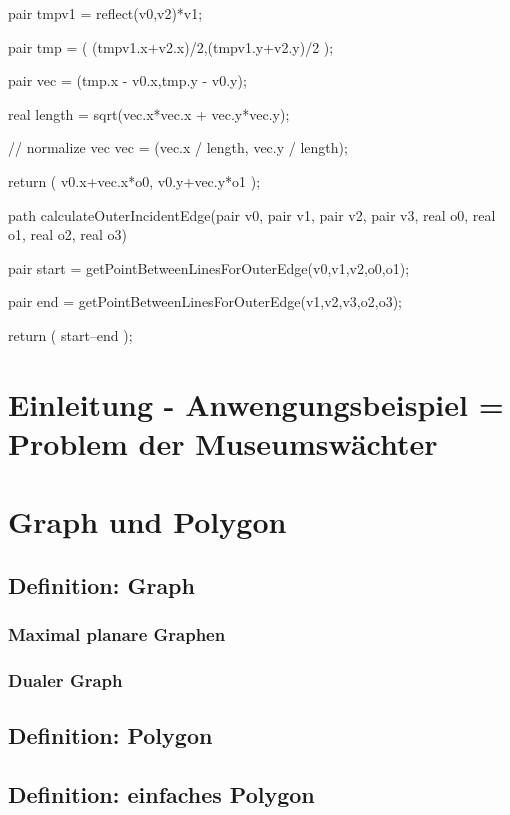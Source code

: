 \documentclass[a4paper]{article}
\begin{document}
\begin{asydef}
{	pair tmpv1 = reflect(v0,v2)*v1;		

	pair tmp = ( (tmpv1.x+v2.x)/2,(tmpv1.y+v2.y)/2 );

	pair vec = (tmp.x - v0.x,tmp.y - v0.y);
	
	real length = sqrt(vec.x*vec.x + vec.y*vec.y);
	
	// normalize vec
	vec = (vec.x / length, vec.y / length);
	
	return ( v0.x+vec.x*o0, v0.y+vec.y*o1 );	
	
}



path calculateOuterIncidentEdge(pair v0, pair v1, pair v2, pair v3, real o0, real o1, 
							real o2, real o3){

	pair start = getPointBetweenLinesForOuterEdge(v0,v1,v2,o0,o1);

	pair end = getPointBetweenLinesForOuterEdge(v1,v2,v3,o2,o3);
	
	return ( start--end );
}


\end{asydef}




\tableofcontents

\newpage


\section{Einleitung - Anwengungsbeispiel = Problem der Museumswächter}

\section{Graph und Polygon}
\subsection{Definition: Graph}
\subsubsection{Maximal planare Graphen}
\subsubsection{Dualer Graph}
\subsection{Definition: Polygon}
\subsection{Definition: einfaches Polygon}
\end{document}
